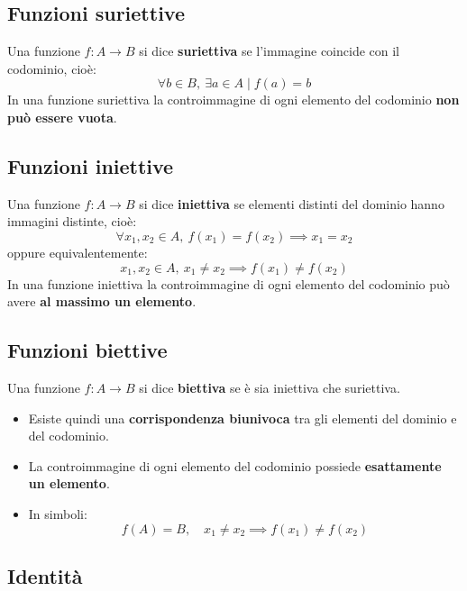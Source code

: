 
\subsection{Funzioni suriettive}
Una funzione $f: A \to B$ si dice \textbf{suriettiva} se l'immagine coincide con il codominio, cioè:
\[
\forall b \in B, \ \exists a \in A \mid f(a) = b
\]
In una funzione suriettiva la controimmagine di ogni elemento del codominio \textbf{non può essere vuota}.

\subsection{Funzioni iniettive}
Una funzione $f: A \to B$ si dice \textbf{iniettiva} se elementi distinti del dominio hanno immagini distinte, cioè:
\[
\forall x_1, x_2 \in A, \ f(x_1) = f(x_2) \implies x_1 = x_2
\]
oppure equivalentemente:
\[
x_1, x_2 \in A, \ x_1 \ne x_2 \implies f(x_1) \ne f(x_2)
\]
In una funzione iniettiva la controimmagine di ogni elemento del codominio può avere \textbf{al massimo un elemento}.

\subsection{Funzioni biettive}
Una funzione $f: A \to B$ si dice \textbf{biettiva} se è sia iniettiva che suriettiva.
\begin{itemize}
    \item Esiste quindi una \textbf{corrispondenza biunivoca} tra gli elementi del dominio e del codominio.
    \item La controimmagine di ogni elemento del codominio possiede \textbf{esattamente un elemento}.
    \item In simboli:
    \[
    f(A) = B, \quad x_1 \ne x_2 \implies f(x_1) \ne f(x_2)
    \]
\end{itemize}

\subsection{Identità}

